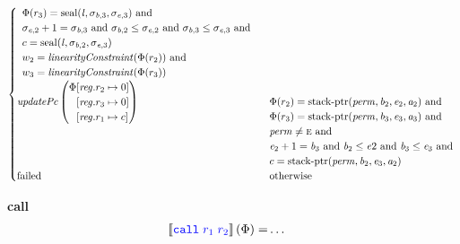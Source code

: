 \documentclass[a4paper]{article}
\newcommand{\sem}[1]{\left\llbracket #1 \right\rrbracket}
\newcommand{\tand}{\text{ and }}
\newcommand{\totherwise}{\text{otherwise }}
\newcommand{\sourcecolor}[1]{\color{blue}}
\newcommand{\src}[1]{{\sourcecolor{} #1}}
\newcommand{\zinstr}[1]{\texttt{#1}}
\newcommand{\twoinstr}[3]{
  \ifthenelse{\equal{#2#3}{}}
  {\zinstr{#1}}
  {\zinstr{#1} \; #2 \; #3}
}
\newcommand{\scall}[2]{\twoinstr{\src{call}}{#1}{#2}}
\newcommand{\update}[2]{[#1 \mapsto #2]}
\newcommand{\updReg}[2]{\update{\reg.#1}{#2}}
\newcommand{\shareddom}[1]{\mathrm{#1}}
\newcommand{\perm}{\var{perm}}
\newcommand{\lin}{\var{l}}
\newcommand{\stkptr}[1]{\mathrm{stack\text{-}ptr}(#1)}
\newcommand{\seal}[1]{\shareddom{seal}(#1)}
\newcommand{\failed}{\mathrm{failed}}
\newcommand{\var}[1]{\mathit{#1}}
\newcommand{\reg}{\var{reg}}
\newcommand{\baddr}{\var{b}}
\newcommand{\eaddr}{\var{e}}
\newcommand{\aaddr}{\var{a}}
\newcommand{\plainperm}[1]{\textsc{#1}}
\newcommand{\enter}{\plainperm{e}}
\newcommand{\plainfun}[2]{
  \ifthenelse{\equal{#2}{}}
  {\mathit{#1}}
  {\mathit{#1}(#2)}
}
\newcommand{\updPcAddr}[1]{\plainfun{updatePc}{#1}}
\newcommand{\linCons}[1]{\plainfun{linearityConstraint}{#1}}
\begin{document}
\begin{align*}
\begin{cases}
\begin{array}[t]{l}
                                  \Phi(r_3) = \seal{\lin,\sigma_{\baddr,3},\sigma_{\eaddr,3}} \tand \\
                                  \sigma_{\eaddr,2}+1 = \sigma_{\baddr,3} \tand \sigma_{\baddr,2} \leq \sigma_{\eaddr,2} \tand \sigma_{\baddr,3} \leq \sigma_{\eaddr,3} \tand \\
                                  c = \seal{\lin,\sigma_{\baddr,2},\sigma_{\eaddr,3}} \\
                                  w_2 = \linCons{\Phi(r_2)} \tand \\
                                  w_3 = \linCons{\Phi(r_3)} \\
                                \end{array}\\
                                \updPcAddr{}\left(
                                \arraycolsep=0pt
                                \begin{array}{r l}
                                  \Phi&\updReg{r_2}{0}\\
                                      &\updReg{r_3}{0}\\
                                      &\updReg{r_1}{c}
                                \end{array}\right)
&
                                \arraycolsep=0pt
                                \begin{array}[t]{l}
                                  \Phi(r_2) = \stkptr{\perm,\baddr_2,\eaddr_2,\aaddr_2} \tand \\
                                  \Phi(r_3) = \stkptr{\perm,\baddr_3,\eaddr_3,\aaddr_3} \tand \\
                                  \perm \neq \enter \tand \\
                                  \eaddr_2 + 1 = \baddr_3 \tand \baddr_2 \leq \eaddr2 \tand \baddr_3 \leq \eaddr_3 \tand \\
                                  c = \stkptr{\perm,\baddr_2,\eaddr_3,\aaddr_2} \\
                                \end{array}\\
                                \failed & \totherwise
                              \end{cases}
\end{align*}

\noindent\textbf{call}\\
\begin{align*}
  \sem{\scall{\src{r_1}}{\src{r_2}}}(\Phi) = & \dots
\end{align*}
\end{document}
